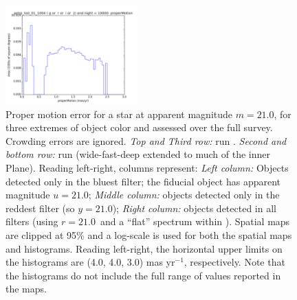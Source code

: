 \begin{figure}[ht]
\begin{center}
  \includegraphics[width=2.0in]{./figs/milkyway/astromPanels/MW_Astrom_pmError_wfdPlane_10y_hst.png}
  \end{center}
  \caption{Proper motion error for a star at apparent magnitude $m=21.0$, for three extremes of object color and assessed over the full survey. Crowding errors are ignored. {\it Top and Third row:} \OpSim run . {\it Second and bottom row:} \OpSim run  (wide-fast-deep extended to much of the inner Plane). Reading left-right, columns represent: {\it Left column:} Objects detected only in the bluest filter; the fiducial object has apparent magnitude $u=21.0$; {\it Middle column:} objects detected only in the reddest filter (so $y = 21.0$); {\it Right column:} objects detected in all filters (using $r=21.0$~and a ``flat'' spectrum within \MAF). Spatial maps are clipped at 95\% and a log-scale is used for both the spatial maps and histograms. Reading left-right, the horizontal upper limits on the histograms are (4.0, 4.0, 3.0) mas yr$^{-1}$, respectively. Note that the histograms do not include the full range of values reported in the maps.}
  \label{fig_astrom_ByFilter_pmError}
\end{figure}

